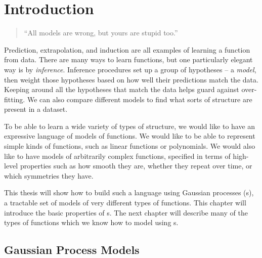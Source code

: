 
\inbpdocument

\chapter{Introduction}
\label{ch:intro}




\begin{quotation}
``All models are wrong, but yours are stupid too.'' \\
\hspace*{\fill} \citet{mlhipster}
\end{quotation}

Prediction, extrapolation, and induction are all examples of learning a function from data.
There are many ways to learn functions, but one particularly elegant way is by \emph{inference}.
Inference procedures set up a group of hypotheses -- a \emph{model}, then weight those hypotheses based on how well their predictions match the data.
Keeping around all the hypotheses that match the data helps guard against over-fitting.
We can also compare different models to find what sorts of structure are present in a dataset.

To be able to learn a wide variety of types of structure, we would like to have an expressive language of models of functions.
We would like to be able to represent simple kinds of functions, such as linear functions or polynomials.
We would also like to have models of arbitrarily complex functions, specified in terms of high-level properties such as how smooth they are, whether they repeat over time, or which symmetries they have.

This thesis will show how to build such a language using Gaussian processes (\gp{}s), a tractable set of models of very different types of functions.
This chapter will introduce the basic properties of \gp{}s.
The next chapter will describe many of the types of functions which we know how to model using \gp{}s.




\section{Gaussian Process Models}

